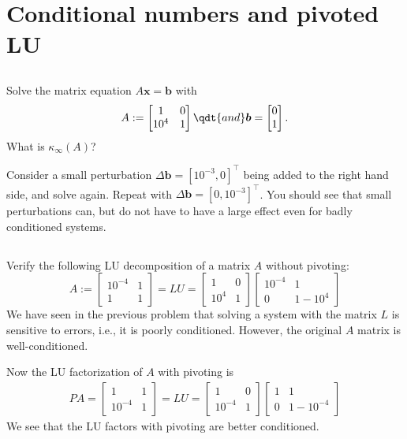 \documentclass[11pt,letterpaper]{article}
\begin{document}
\section{Conditional numbers and pivoted LU}
\subsection{}
Solve the matrix equation $A\boldsymbol x = \boldsymbol b$ with 
\begin{align*}
  A:=
  \begin{bmatrix}
    1       & 0  \\
    10^{4}  & 1
  \end{bmatrix}
  \qdt{ and }
  \boldsymbol b = \begin{bmatrix}
  0\\1
  \end{bmatrix}.
\end{align*}
What is $\kappa_\infty(A)$?

Consider a small perturbation $\Delta \boldsymbol b=[10^{-3},0]^\top$ being added to the right hand side, and solve again. Repeat with $\Delta \boldsymbol b =[0,10^{-3}]^\top$. You should see that small perturbations can, but do not have to have a large effect even for badly conditioned systems.

\subsection{}
Verify the following LU decomposition of a matrix $A$ without pivoting:
  $$
  A := \begin{bmatrix} 10^{-4} & 1\\ 1 & 1
  \end{bmatrix} = LU =
  \begin{bmatrix} 1 & 0\\ 10^4 & 1
  \end{bmatrix}
  \begin{bmatrix} 10^{-4} & 1\\ 0 & 1-10^4
  \end{bmatrix}
  $$ 
We have seen in the previous problem that solving a system with the matrix $L$ is sensitive to errors, i.e., it is poorly conditioned. However, the original $A$ matrix is well-conditioned.

Now the LU factorization of $A$ with pivoting is
\begin{align*}
PA = \begin{bmatrix} 1 & 1 \\ 10^{-4} & 1
  \end{bmatrix} = LU =
  \begin{bmatrix} 1 & 0\\ 10^{-4} & 1
  \end{bmatrix}
  \begin{bmatrix} 1 & 1\\ 0 & 1-10^{-4}
  \end{bmatrix}
\end{align*}
We see that the LU factors with pivoting are better conditioned.
\end{document}
